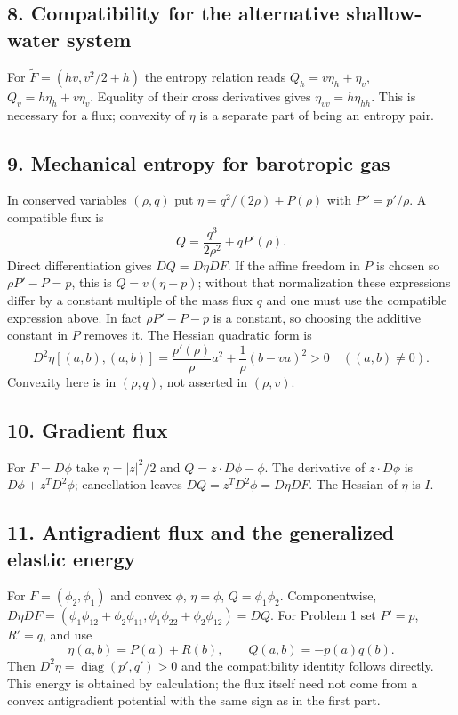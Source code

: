 \subsection*{8. Compatibility for the alternative shallow-water system}
For $\widetilde F=(hv,v^2/2+h)$ the entropy relation reads
$Q_h=v\eta_h+\eta_v$, $Q_v=h\eta_h+v\eta_v$.
Equality of their cross derivatives gives
$\eta_{vv}=h\eta_{hh}$. This is necessary for a flux; convexity of
$\eta$ is a separate part of being an entropy pair.

\subsection*{9. Mechanical entropy for barotropic gas}
In conserved variables $(\rho,q)$ put
$\eta=q^2/(2\rho)+P(\rho)$ with $P''=p'/\rho$.
A compatible flux is
\[
 Q=\frac{q^3}{2\rho^2}+qP'(\rho).
\]
Direct differentiation gives $DQ=D\eta DF$. If the affine freedom
in $P$ is chosen so $\rho P'-P=p$, this is
$Q=v(\eta+p)$; without that normalization these expressions differ
by a constant multiple of the mass flux $q$ and one must use the
compatible expression above. In fact $\rho P'-P-p$ is a constant,
so choosing the additive constant in $P$ removes it.
The Hessian quadratic form is
\[
 D^2\eta[(a,b),(a,b)]
 =\frac{p'(\rho)}\rho a^2+\frac1\rho(b-va)^2>0
 \quad ((a,b)\ne0).
\]
Convexity here is in $(\rho,q)$, not asserted in $(\rho,v)$.

\subsection*{10. Gradient flux}
For $F=D\phi$ take $\eta=|z|^2/2$ and
$Q=z\cdot D\phi-\phi$. The derivative of $z\cdot D\phi$ is
$D\phi+z^TD^2\phi$; cancellation leaves $DQ=z^TD^2\phi=D\eta DF$.
The Hessian of $\eta$ is $I$.

\subsection*{11. Antigradient flux and the generalized elastic energy}
For $F=(\phi_2,\phi_1)$ and convex $\phi$,
$\eta=\phi$, $Q=\phi_1\phi_2$. Componentwise,
$D\eta DF=(\phi_1\phi_{12}+\phi_2\phi_{11},
\phi_1\phi_{22}+\phi_2\phi_{12})=DQ$.
For Problem 1 set $P'=p$, $R'=q$, and use
\[
 \eta(a,b)=P(a)+R(b),\qquad Q(a,b)=-p(a)q(b).
\]
Then $D^2\eta=\operatorname{diag}(p',q')>0$ and the compatibility
identity follows directly. This energy is obtained by calculation;
the flux itself need not come from a convex antigradient potential
with the same sign as in the first part.

